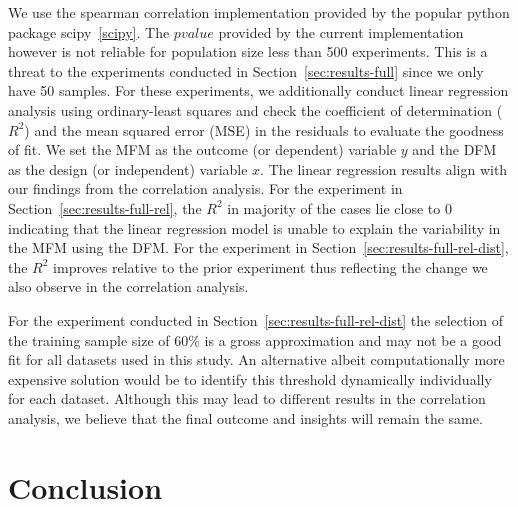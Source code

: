 \documentclass{article}
\begin{document}
We use the spearman correlation implementation provided by the popular
python package scipy \ref{scipy}. The $pvalue$ provided by the current
implementation however is not reliable for population size less than
500 experiments. This is a threat to the experiments conducted in
Section \ref{sec:results-full} since we only have 50 samples. For
these experiments, we additionally conduct linear regression analysis
using ordinary-least squares and check the coefficient of
determination ($R^2$) and the mean squared error (MSE) in the
residuals to evaluate the goodness of fit. We set the MFM as the
outcome (or dependent) variable $y$ and the DFM as the design (or
independent) variable $x$. The linear regression results align with
our findings from the correlation analysis. For the experiment in
Section \ref{sec:results-full-rel}, the $R^2$ in majority of the cases
lie close to 0 indicating that the linear regression model is unable
to explain the variability in the MFM using the DFM. For the
experiment in Section \ref{sec:results-full-rel-dist}, the $R^2$
improves relative to the prior experiment thus reflecting the change
we also observe in the correlation analysis.


For the experiment conducted in
Section \ref{sec:results-full-rel-dist} the selection of the training
sample size of 60\% is a gross approximation and may not be a good fit
for all datasets used in this study. An alternative albeit
computationally more expensive solution would be to identify this
threshold dynamically individually for each dataset. Although this may
lead to different results in the correlation analysis, we believe that
the final outcome and insights will remain the same.



\section{Conclusion}\label{sec:conclude}



\end{document}
